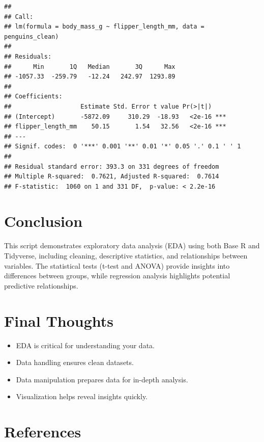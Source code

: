 \documentclass[
]{book}
\providecommand{\tightlist}{%
  \setlength{\itemsep}{0pt}\setlength{\parskip}{0pt}}
\begin{document}
\begin{verbatim}
## 
## Call:
## lm(formula = body_mass_g ~ flipper_length_mm, data = penguins_clean)
## 
## Residuals:
##      Min       1Q   Median       3Q      Max 
## -1057.33  -259.79   -12.24   242.97  1293.89 
## 
## Coefficients:
##                   Estimate Std. Error t value Pr(>|t|)    
## (Intercept)       -5872.09     310.29  -18.93   <2e-16 ***
## flipper_length_mm    50.15       1.54   32.56   <2e-16 ***
## ---
## Signif. codes:  0 '***' 0.001 '**' 0.01 '*' 0.05 '.' 0.1 ' ' 1
## 
## Residual standard error: 393.3 on 331 degrees of freedom
## Multiple R-squared:  0.7621, Adjusted R-squared:  0.7614 
## F-statistic:  1060 on 1 and 331 DF,  p-value: < 2.2e-16
\end{verbatim}

\hypertarget{conclusion-1}{%
\section{Conclusion}\label{conclusion-1}}

This script demonstrates exploratory data analysis (EDA) using both Base R and Tidyverse, including cleaning, descriptive statistics, and relationships between variables. The statistical tests (t-test and ANOVA) provide insights into differences between groups, while regression analysis highlights potential predictive relationships.

\hypertarget{final-thoughts}{%
\section{Final Thoughts}\label{final-thoughts}}

\begin{itemize}
\tightlist
\item
  EDA is critical for understanding your data.\\
\item
  Data handling ensures clean datasets.\\
\item
  Data manipulation prepares data for in-depth analysis.\\
\item
  Visualization helps reveal insights quickly.
\end{itemize}

\hypertarget{references}{%
\section{References}\label{references}}
\end{document}
